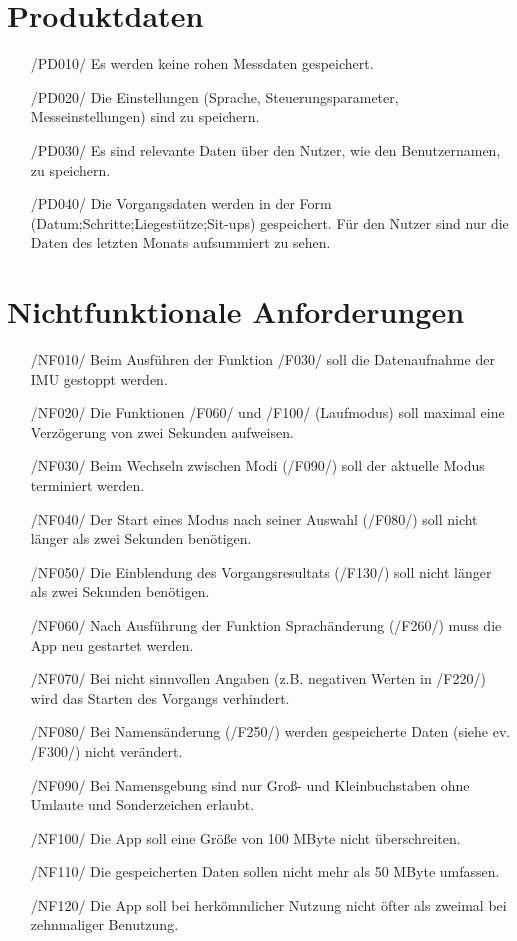 \documentclass[a4paper,12pt]{article}
\begin{document}
\section{Produktdaten}
\begin{itemize}
	\item[/PD010/] Es werden keine rohen Messdaten gespeichert.
	\item[/PD020/] Die Einstellungen (Sprache, Steuerungsparameter, Messeinstellungen) sind zu speichern. 
	\item[/PD030/] Es sind relevante Daten über den Nutzer, wie den Benutzernamen, zu speichern.
	\item[/PD040/] Die Vorgangsdaten werden in der Form (Datum;Schritte;Liegestütze;Sit-ups) gespeichert. Für den Nutzer sind nur die Daten des letzten Monats aufsummiert zu sehen.
\end{itemize}


\section{Nichtfunktionale Anforderungen}

\begin{itemize}
  \item[/NF010/] Beim Ausführen der Funktion /F030/ soll die Datenaufnahme der IMU gestoppt werden.
  \item[/NF020/] Die Funktionen /F060/ und /F100/ (Laufmodus) soll maximal eine Verzögerung von zwei Sekunden aufweisen. %
  \item[/NF030/] Beim Wechseln zwischen Modi (/F090/) soll der aktuelle Modus terminiert werden.
  \item[/NF040/] Der Start eines Modus nach seiner Auswahl (/F080/) soll nicht länger als zwei Sekunden benötigen. %
  \item[/NF050/] Die Einblendung des Vorgangsresultats (/F130/) soll nicht länger als zwei Sekunden benötigen.%
  \item[/NF060/] Nach Ausführung der Funktion  Sprachänderung (/F260/) muss die App neu gestartet werden.
  \item[/NF070/] Bei nicht sinnvollen Angaben (z.B. negativen Werten in /F220/) wird das Starten des Vorgangs verhindert.
  \item[/NF080/] Bei Namensänderung (/F250/) werden gespeicherte Daten (siehe ev. /F300/) nicht verändert.
  \item[/NF090/] Bei Namensgebung sind nur Groß- und Kleinbuchstaben ohne Umlaute und Sonderzeichen erlaubt.
  \item[/NF100/] Die App soll eine Größe von 100 MByte nicht überschreiten. %
  \item[/NF110/] Die gespeicherten Daten sollen nicht mehr als 50 MByte umfassen. %
  \item[/NF120/] Die App soll bei herkömmlicher Nutzung nicht öfter als zweimal bei zehnmaliger Benutzung. %
\end{itemize}
\end{document}
